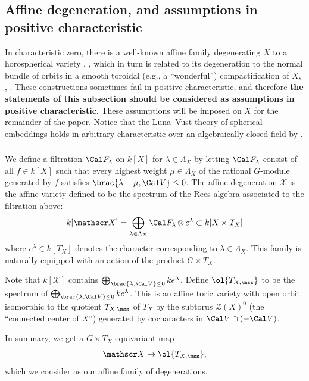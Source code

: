 \documentclass[final]{amsart}
\theoremstyle{remark}
\theoremstyle{definition}
\DeclareMathOperator*{\ot}{\otimes}
\numberwithin{equation}{section}
\begin{document}
\subsection{Affine degeneration, and assumptions in positive characteristic} \label{sect:affine-degeneration}  \label{assumptions-finitefield}

In characteristic zero, there is a well-known affine family degenerating $X$ to a horospherical variety \cite{Pop86}, \cite[\S 5.1]{GN}, which in turn is related to its degeneration to the normal bundle of orbits in a smooth toroidal (e.g., a ``wonderful'') compactification of $X$, 
\cite{Brion07}, \cite[\S 2.5]{SV}. These constructions sometimes fail in positive characteristic, and therefore \textbf{the statements of this subsection should be considered as assumptions in positive characteristic}. These assumptions will be imposed on $X$ for the remainder of the paper. Notice that the Luna--Vust theory of spherical embeddings holds in arbitrary characteristic over an algebraically closed field by \cite{KnLV}. 


\subsubsection{}
We define a filtration $\Cal F_{\lambda}$ on $k[X]$ for $\lambda \in \Lambda_X$ 
by letting $\Cal F_{\lambda}$ consist of all $f \in k[X]$
such that every highest weight $\mu \in \Lambda_X$ of the rational $G$-module 
generated by $f$ satisfies $\brac{\lambda-\mu, \Cal V} \le 0$.
The affine degeneration $\mathscr X$ is the affine variety defined to be the
spectrum of the Rees algebra associated to the filtration above: 
\[ k[\mathscr X] = \bigoplus_{\lambda\in \Lambda_X} \Cal F_\lambda \ot e^\lambda \subset k[X \times T_X] 
\] 
where $e^\lambda \in k[T_X]$ denotes the character corresponding to $\lambda \in \Lambda_X$. This family is naturally equipped with an action of the product $G\times T_X$.

Note that $k[\mathscr X]$ contains $\bigoplus_{\brac{\lambda,\Cal V}\le 0} k e^\lambda$. 
Define $\ol{T_{X,\mss}}$ to be the spectrum of $\bigoplus_{\brac{\lambda,\Cal V}\le 0} k e^\lambda$. 
This is an affine toric variety with open orbit isomorphic to the
quotient $T_{X,\mss}$ of $T_X$ by the subtorus $\mathcal Z(X)^0$ (the ``connected center of $X$'') generated by cocharacters in $\Cal V \cap (-\Cal V)$.

In summary, we get a $G \times T_X$-equivariant map 
\[ \mathscr X \to \ol{T_{X,\mss}}, \] 
which we consider as our affine family of degenerations.
\end{document}
